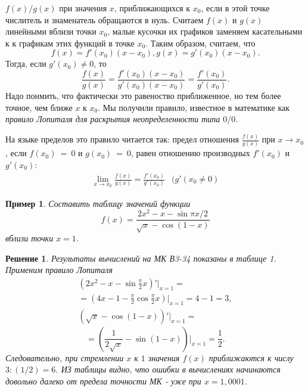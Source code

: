 \documentclass[10dd, a5paper]{article}
\newtheorem{exmp}{Пример}
\newtheorem{sol}{Решение}
\begin{document}
\begin{multicols}{2}
\linespread{0.65}\selectfont
\noindent $f(x)/g(x)$ при значения $x$, приближающихся к $x_0$, если в этой точке числитель и знаменатель обращаются в нуль. Считаем $f(x)$ и $g(x)$ линейными вблизи точки $x_0$, малые кусочки их графиков заменяем касательными к к графикам этих функций в точке $x_0$. Таким образом, считаем, что\[f(x) = f'(x_0)(x-x_0), g(x)=g'(x_0)(x-x_0).\] Тогда, если $g'(x_0)\neq0$, то\[\frac{f(x)}{g(x)}=\frac{f'(x_0)(x-x_0)}{g'(x_0)(x-x_0)}=\frac{f'(x_0)}{g'(x_0)}.\] Надо понмить, что фактически это равеноство приближенное, но тем более точное, чем ближе $x$ к $x_0$. Мы получили правило, известное в математике как \itshape правило Лопиталя для раскрытия неопределенности типа $0/0$\upshape.

\linespread{0.65}\selectfont
{\footnotesize На языке пределов это правило читается так: предел отношения $\frac{f(x)}{g(x)}$ при $x\rightarrow x_0$, если $f(x_0)~=~0$ и $g(x_0)~=~0$, равен отношению производных $f'(x_0)$ и $g'(x_0)$:
{\setlength{\belowdisplayskip}{1dd} \setlength{\belowdisplayshortskip}{1dd}
\setlength{\abovedisplayskip}{1dd} \setlength{\abovedisplayshortskip}{1dd}
\[\begin{array}{cr}
\lim\limits_{x \to x_0} \frac{f(x)}{g(x)}=
\frac{f'(x_0)}{g'(x_0)}&(g'(x_0\neq 0)
\end{array}\]}}
\begin{exmp}
Составить таблицу значений функции \[f(x) = \frac{2x^2-x-
\sin\pi x/2}{\sqrt{x}-\cos(1-x)}\]вблизи точки $x=1$.
\end{exmp}
\begin{sol}
Результаты вычислений на МК В3-34 показаны в таблице 1. Применим правило Лопиталя
\begin{multline*}
(2x^2-x-\sin\frac{\pi}{2}x)'\vert_{x=1}=\\
= (4x-1-\frac{\pi}{2}\cos\frac{\pi}{2}x)\vert_{x=1} = 4 -1 =3,\\
(\sqrt{x}-\cos(1-x))'\vert_{x=1}=
\end{multline*}
\[=(\frac{1}{2\sqrt{x}}-\sin(1-x))\vert_{x=1}=\frac{1}{2}.\]
Следовательно, при стремлении $x$ к $1$ значения $f(x)$ приближаются к числу $3:(1/2)=6$. ИЗ таблицы видно, что ошибки в вычислениях начинаются довольно далеко от предела точности МК - уже при $x=1,0001$.
\end{sol}

\end{multicols}
\end{document}
